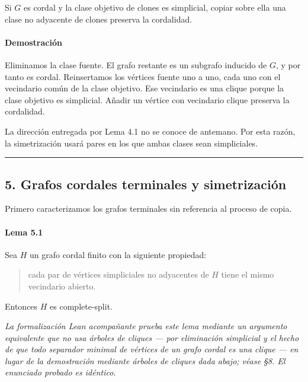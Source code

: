 \documentclass[
  spanish,
  11pt,
  a4paper,
]{article}
\begin{document}
Si \(G\) es cordal y la clase objetivo de clones es simplicial, copiar sobre ella una clase no adyacente de clones preserva la cordalidad.

\paragraph{Demostración}\label{demostraciuxf3n-4}

Eliminamos la clase fuente. El grafo restante es un subgrafo inducido de \(G\), y por tanto es cordal. Reinsertamos los vértices fuente uno a uno, cada uno con el vecindario común de la clase objetivo. Ese vecindario es una clique porque la clase objetivo es simplicial. Añadir un vértice con vecindario clique preserva la cordalidad.

La dirección entregada por Lema 4.1 no se conoce de antemano. Por esta razón, la simetrización usará pares en los que ambas clases sean simpliciales.

\begin{center}\rule{0.5\linewidth}{0.5pt}\end{center}

\subsection{5. Grafos cordales terminales y simetrización}\label{grafos-cordales-terminales-y-simetrizaciuxf3n}

Primero caracterizamos los grafos terminales sin referencia al proceso de copia.

\paragraph{Lema 5.1}\label{lema-5.1}

Sea \(H\) un grafo cordal finito con la siguiente propiedad:

\begin{quote}
cada par de vértices simpliciales no adyacentes de \(H\) tiene el mismo vecindario abierto.
\end{quote}

Entonces \(H\) es complete-split.

\emph{La formalización Lean acompañante prueba este lema mediante un argumento equivalente que no usa árboles de cliques --- por eliminación simplicial y el hecho de que todo separador minimal de vértices de un grafo cordal es una clique --- en lugar de la demostración mediante árboles de cliques dada abajo; véase §8. El enunciado probado es idéntico.}
\end{document}
